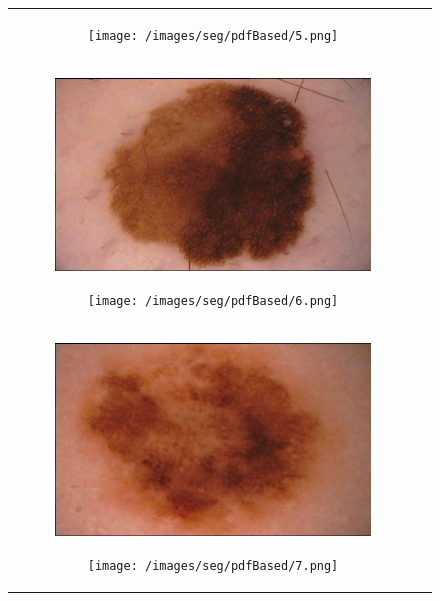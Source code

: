 \documentclass[a4paper, 10pt, conference]{ieeeconf}        %
\begin{document}
\begin{figure}[ht!]
\begin{tabular}{c c}
\begin{subfigure}{0.2\textwidth}
 \end{subfigure}
 \begin{subfigure}{0.2\textwidth}
 \texttt{[image: /images/seg/pdfBased/5.png]}\caption{}
 \end{subfigure}\\
 \begin{subfigure}{0.2\textwidth}
  \includegraphics[scale=0.15]{original06.JPG}\caption{}
  \end{subfigure}
  \begin{subfigure}{0.2\textwidth}
  \texttt{[image: /images/seg/pdfBased/6.png]}\caption{}
  \end{subfigure}\\
 \begin{subfigure}{0.2\textwidth}
  \includegraphics[scale=0.15]{original07.JPG}\caption{}
  \end{subfigure}
  \begin{subfigure}{0.2\textwidth}
  \texttt{[image: /images/seg/pdfBased/7.png]}\caption{}
  \end{subfigure}\\

\end{tabular}
\end{figure}
\end{document}
